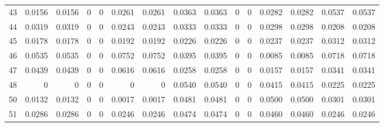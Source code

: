 \begin{table}[H]
\begin{tabular}{rrrrrrrrrrrrrrr}
43 & 0.0156 & 0.0156 & 0 & 0 & 0.0261 & 0.0261 & 0.0363 & 0.0363 & 0 & 0 & 0.0282 & 0.0282 & 0.0537 & 0.0537 \\
44 & 0.0319 & 0.0319 & 0 & 0 & 0.0243 & 0.0243 & 0.0333 & 0.0333 & 0 & 0 & 0.0298 & 0.0298 & 0.0208 & 0.0208 \\
45 & 0.0178 & 0.0178 & 0 & 0 & 0.0192 & 0.0192 & 0.0226 & 0.0226 & 0 & 0 & 0.0237 & 0.0237 & 0.0312 & 0.0312 \\
46 & 0.0535 & 0.0535 & 0 & 0 & 0.0752 & 0.0752 & 0.0395 & 0.0395 & 0 & 0 & 0.0085 & 0.0085 & 0.0718 & 0.0718 \\
47 & 0.0439 & 0.0439 & 0 & 0 & 0.0616 & 0.0616 & 0.0258 & 0.0258 & 0 & 0 & 0.0157 & 0.0157 & 0.0341 & 0.0341 \\
48 & 0 & 0 & 0 & 0 & 0 & 0 & 0.0540 & 0.0540 & 0 & 0 & 0.0415 & 0.0415 & 0.0225 & 0.0225 \\
50 & 0.0132 & 0.0132 & 0 & 0 & 0.0017 & 0.0017 & 0.0481 & 0.0481 & 0 & 0 & 0.0500 & 0.0500 & 0.0301 & 0.0301 \\
51 & 0.0286 & 0.0286 & 0 & 0 & 0.0246 & 0.0246 & 0.0474 & 0.0474 & 0 & 0 & 0.0460 & 0.0460 & 0.0246 & 0.0246 \\
\bottomrule
\end{tabular}
\end{table}

